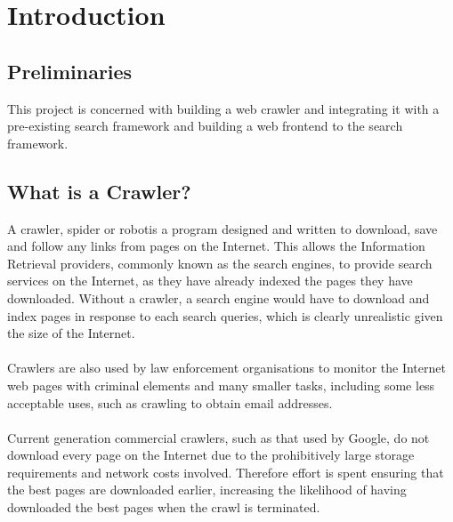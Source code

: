 \chapter{Introduction}

\section{Preliminaries}
This project is concerned with building a web crawler and integrating it with a pre-existing search framework and building a web frontend to the search framework.
\section{What is a Crawler?}
A crawler, spider or robot\footnotemark is a program designed and written to download, save and follow any links from pages on the Internet. This allows the Information Retrieval providers, commonly known as the search engines, to provide search services on the Internet, as they have already indexed the pages they have downloaded. Without a crawler, a search engine would have to download and index pages in response to each search queries, which is clearly unrealistic given the size of the Internet. \\
\ \\
Crawlers are also used by law enforcement organisations to monitor the Internet web pages with criminal elements and many smaller tasks, including some less acceptable uses, such as crawling to obtain email addresses.\\
\ \\
Current generation commercial crawlers, such as that used by Google, do not download every page on the Internet due to the prohibitively large storage requirements and network costs involved. Therefore effort is spent ensuring that the best pages are downloaded earlier, increasing the likelihood of having downloaded the best pages when the crawl is terminated.\\

